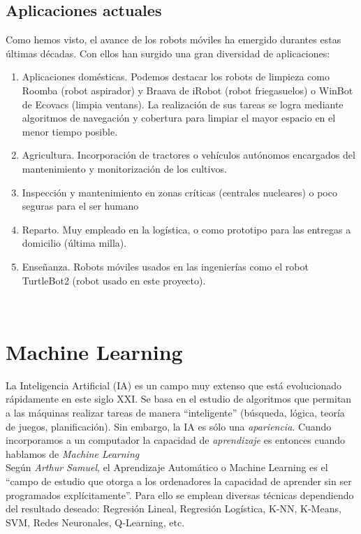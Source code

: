 \subsection{Aplicaciones actuales}
\label{subsec:aplicaciones_actuales}
Como hemos visto, el avance de los robots móviles ha emergido durantes estas últimas décadas. Con ellos han surgido una gran diversidad de aplicaciones:

\begin{enumerate}
	\item Aplicaciones domésticas. Podemos destacar los robots de limpieza como Roomba (robot aspirador) y Braava de iRobot (robot friegasuelos) o WinBot de Ecovacs (limpia ventans). La realización de sus tareas se logra mediante algoritmos de navegación y cobertura para limpiar el mayor espacio en el menor tiempo posible.
	\item Agricultura. Incorporación de tractores o vehículos autónomos encargados del mantenimiento y monitorización de los cultivos.
	\item Inspección y mantenimiento en zonas críticas (centrales nucleares) o poco seguras para el ser humano
	\item Reparto. Muy empleado en la logística, o como prototipo para las entregas a domicilio (última milla).
	\item Enseñanza. Robots móviles usados en las ingenierías como el robot TurtleBot2 (robot usado en este proyecto).
\end{enumerate}\



\section{Machine Learning}
\label{sec:machine_learning}
La Inteligencia Artificial (IA) es un campo muy extenso que está evolucionado rápidamente en este siglo XXI. Se basa en el estudio de algoritmos que permitan a las máquinas realizar tareas de manera ``inteligente'' (búsqueda, lógica, teoría de juegos, planificación). Sin embargo, la IA es sólo una \textit{apariencia}. Cuando incorporamos a un computador la capacidad de \textit{aprendizaje} es entonces cuando hablamos de \textit{Machine Learning}\\

Según \emph{Arthur Samuel}, el Aprendizaje Automático o Machine Learning es el ``campo de estudio que otorga a los ordenadores la capacidad de aprender sin ser programados explícitamente''. Para ello se emplean diversas técnicas dependiendo del resultado deseado: Regresión Lineal, Regresión Logística, K-NN, K-Means, SVM, Redes Neuronales, Q-Learning, etc.\\


